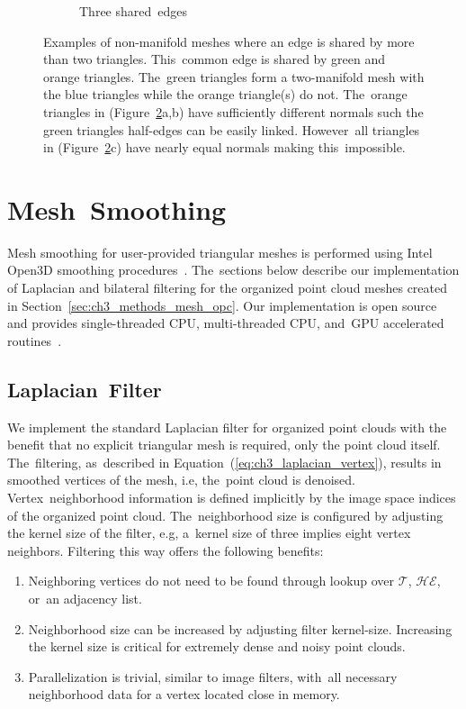 \begin{figure}[H]
\begin{subfigure}{.30\linewidth}
    \caption{Three shared~edges\label{fig:ch3_NonMainifoldCond2C}}\vspace{6pt}
  \end{subfigure}
  \caption{Examples of non-manifold meshes where an edge is shared by more than two triangles. This~common edge is shared by green and orange triangles. The~green triangles form a two-manifold mesh with the blue triangles while the orange triangle(s) do not. The~orange triangles in (Figure~\ref{fig:ch3_NonMainifoldCond2}a,b) have sufficiently different normals such the green triangles half-edges can be easily linked. However~all triangles in (Figure~\ref{fig:ch3_NonMainifoldCond2}c) have nearly equal normals making this~impossible.}\label{fig:ch3_NonMainifoldCond2}
\end{figure}
\unskip




\section{Mesh~Smoothing}\label{sec:ch3_methods_mesh_smoothing}

Mesh smoothing for user-provided triangular meshes is performed using Intel Open3D smoothing procedures~\cite{zhou_open3d_2018}.  The~sections below describe our implementation of Laplacian and bilateral filtering for the organized point cloud meshes created in Section~\ref{sec:ch3_methods_mesh_opc}.  Our implementation is open source and provides single-threaded CPU, multi-threaded CPU, and~GPU accelerated routines~\cite{Castagno_Github_opf}. 

\subsection{Laplacian~Filter}\label{sec:ch3_methods_mesh_smoothing_laplacian}

We implement the standard Laplacian filter for organized point clouds with the benefit that no explicit triangular mesh is required, only the point cloud itself. The~filtering, as~described in Equation~(\ref{eq:ch3_laplacian_vertex}), results in smoothed vertices of the mesh, i.e, the~point cloud is denoised. Vertex~neighborhood information is defined implicitly by the image space indices of the organized point cloud.  The~neighborhood size is configured by adjusting the kernel size of the filter, e.g, a~kernel size of three implies eight vertex neighbors. Filtering this way offers the following benefits:

\begin{enumerate}
    \item Neighboring vertices do not need to be found through lookup over $\mathcal{T}$, $\mathcal{HE}$, or~an adjacency list. 
    \item Neighborhood size can be increased by adjusting filter kernel-size. Increasing the kernel size is critical for extremely dense and noisy point clouds.
    \item Parallelization is trivial, similar to image filters, with~all necessary neighborhood data for a vertex located close in memory.
\end{enumerate}


